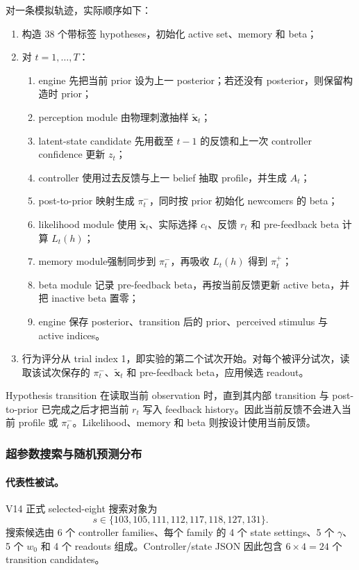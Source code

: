 对一条模拟轨迹，实际顺序如下：
\begin{enumerate}
    \item 构造 38 个带标签 hypotheses，初始化 active set、memory 和 beta；
    \item 对 $t=1,\ldots,T$：
    \begin{enumerate}
        \item engine 先把当前 prior 设为上一 posterior；若还没有 posterior，则保留构造时 prior；
        \item perception module 由物理刺激抽样 $\widetilde{\mathbf x}_t$；
        \item latent-state candidate 先用截至 $t-1$ 的反馈和上一次 controller confidence 更新 $z_t$；
        \item controller 使用过去反馈与上一 belief 抽取 profile，并生成 $A_t$；
        \item post-to-prior 映射生成 $\pi_t^-$，同时按 prior 初始化 newcomers 的 beta；
        \item likelihood module 使用 $\widetilde{\mathbf x}_t$、实际选择 $c_t$、反馈 $r_t$ 和 pre-feedback beta 计算 $L_t(h)$；
        \item memory module强制同步到 $\pi_t^-$，再吸收 $L_t(h)$ 得到 $\pi_t^+$；
        \item beta module 记录 pre-feedback beta，再按当前反馈更新 active beta，并把 inactive beta 置零；
        \item engine 保存 posterior、transition 后的 prior、perceived stimulus 与 active indices。
    \end{enumerate}
    \item 行为评分从 trial index 1，即实验的第二个试次开始。对每个被评分试次，读取该试次保存的 $\pi_t^-$、$\widetilde{\mathbf x}_t$ 和 pre-feedback beta，应用候选 readout。
\end{enumerate}

Hypothesis transition 在读取当前 observation 时，直到其内部 transition 与 post-to-prior 已完成之后才把当前 $r_t$ 写入 feedback history。因此当前反馈不会进入当前 profile 或 $\pi_t^-$。Likelihood、memory 和 beta 则按设计使用当前反馈。


\subsubsection{超参数搜索与随机预测分布}

\paragraph{代表性被试。}
V14 正式 selected-eight 搜索对象为
\begin{equation}
    s\in
    \{103,105,111,112,117,118,127,131\}.
    \label{eq:modelv14-selected-subjects}
\end{equation}
搜索候选由 6 个 controller families、每个 family 的 4 个 state settings、5 个 $\gamma$、5 个 $w_0$ 和 4 个 readouts 组成。Controller/state JSON 因此包含 $6\times4=24$ 个 transition candidates。

